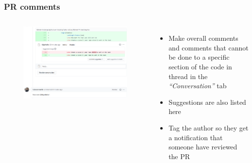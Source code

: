 \documentclass[aspectratio=169]{beamer} %
\begin{document}
\begin{frame}
	\frametitle{PR comments}
	\begin{columns}[c]

		\vspace{-.75cm}
		\begin{figure}
			\centering
			\includegraphics[width=\textwidth]{./img/pr-comment.png}
		\end{figure}

		\begin{itemize}
			\setlength\itemsep{1em}
			\item Make overall comments and comments that cannot be done to a specific section of the code in thread in the \textit{``Conversation''} tab
			\item Suggestions are also listed here
			\item Tag the author so they get a notification that someone have reviewed the PR
		\end{itemize}

	\end{columns}
\end{frame}
\end{document}
